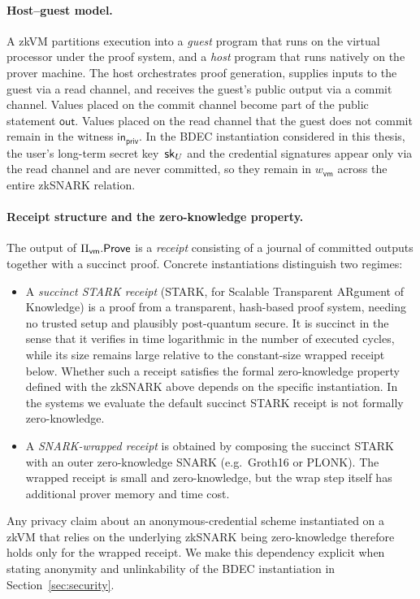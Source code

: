 \paragraph{Host--guest model.}
A zkVM partitions execution into a \emph{guest} program that runs on the virtual processor under the proof system, and a \emph{host} program that runs natively on the prover machine. The host orchestrates proof generation, supplies inputs to the guest via a read channel, and receives the guest's public output via a commit channel. Values placed on the commit channel become part of the public statement $\mathsf{out}$. Values placed on the read channel that the guest does not commit remain in the witness $\mathsf{in}_{\mathsf{priv}}$. In the BDEC instantiation considered in this thesis, the user's long-term secret key~$\mathsf{sk}_U$ and the credential signatures appear only via the read channel and are never committed, so they remain in $w_{\mathsf{vm}}$ across the entire zkSNARK relation.

\paragraph{Receipt structure and the zero-knowledge property.}
The output of $\Pi_{\mathsf{vm}}.\mathsf{Prove}$ is a \emph{receipt} consisting of a journal of committed outputs together with a succinct proof. Concrete instantiations distinguish two regimes:
\begin{itemize}
  \item A \emph{succinct STARK receipt} (STARK, for Scalable Transparent ARgument of Knowledge) is a proof from a transparent, hash-based proof system, needing no trusted setup and plausibly post-quantum secure. It is succinct in the sense that it verifies in time logarithmic in the number of executed cycles, while its size remains large relative to the constant-size wrapped receipt below. Whether such a receipt satisfies the formal zero-knowledge property defined with the zkSNARK above depends on the specific instantiation. In the systems we evaluate the default succinct STARK receipt is not formally zero-knowledge.
  \item A \emph{SNARK-wrapped receipt} is obtained by composing the succinct STARK with an outer zero-knowledge SNARK (e.g.\ Groth16 or PLONK). The wrapped receipt is small and zero-knowledge, but the wrap step itself has additional prover memory and time cost.
\end{itemize}
Any privacy claim about an anonymous-credential scheme instantiated on a zkVM that relies on the underlying zkSNARK being zero-knowledge therefore holds only for the wrapped receipt. We make this dependency explicit when stating anonymity and unlinkability of the BDEC instantiation in Section~\ref{sec:security}.

